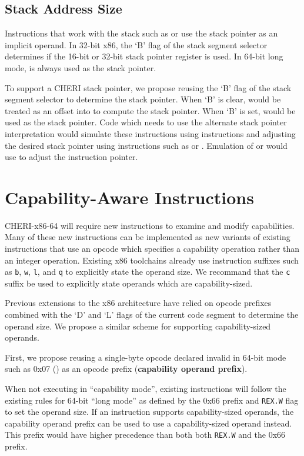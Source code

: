 \subsection{Stack Address Size}

Instructions that work with the stack such as  or
 use the stack pointer as an implicit operand.  In
32-bit x86, the `B' flag of the stack segment selector determines if
the 16-bit or 32-bit stack pointer register is used.  In 64-bit long
mode, \RSP{} is always used as the stack pointer.

To support a CHERI stack pointer, we propose reusing the `B' flag of
the stack segment selector to determine the stack pointer.  When `B'
is clear, \RSP{} would be treated as an offset into \DDC{} to compute
the stack pointer.  When `B' is set, \CSP{} would be used as the stack
pointer.  Code which needs to use the alternate stack pointer
interpretation would simulate these instructions using 
instructions and adjusting the desired stack pointer using
instructions such as  or .  Emulation of
 or  would use  to
adjust the instruction pointer.

\section{Capability-Aware Instructions}

CHERI-x86-64 will require new instructions to examine and modify
capabilities.  Many of these new instructions can be implemented as
new variants of existing instructions that use an opcode which
specifies a capability operation rather than an integer operation.
Existing x86 toolchains already use instruction suffixes such as
\texttt{b}, \texttt{w}, \texttt{l}, and \texttt{q} to explicitly state
the operand size.  We recommand that the \texttt{c} suffix be used to
explicitly state operands which are capability-sized.

Previous extensions to the x86 architecture have relied on opcode
prefixes combined with the `D' and `L' flags of the current code
segment to determine the operand size.  We propose a similar
scheme for supporting capability-sized operands.

First, we propose reusing a single-byte opcode declared invalid in
64-bit mode such as 0x07 () as an opcode prefix
(\textbf{capability operand prefix}).

When not executing in ``capability mode'', existing instructions will
follow the existing rules for 64-bit ``long mode'' as defined by the
0x66 prefix and \texttt{REX.W} flag to set the operand size.  If an
instruction supports capability-sized operands, the capability operand
prefix can be used to use a capability-sized operand instead.  This
prefix would have higher precedence than both both \texttt{REX.W} and
the 0x66 prefix.

